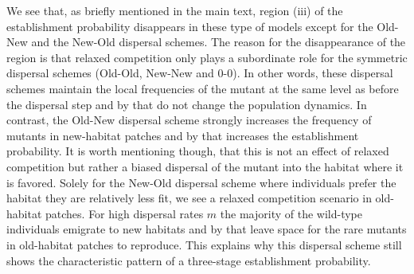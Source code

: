 \documentclass[11pt]{article}
\begin{document}
We see that, as briefly mentioned in the main text, region (iii) of the establishment probability disappears in these type of models except for the Old-New and the New-Old dispersal schemes. The reason for the disappearance of the region is that relaxed competition only plays a subordinate role for the symmetric dispersal schemes (Old-Old, New-New and 0-0). In other words, these dispersal schemes maintain the local frequencies of the mutant at the same level as before the dispersal step and by that do not change the population dynamics. In contrast, the Old-New dispersal scheme strongly increases the frequency of mutants in new-habitat patches and by that increases the establishment probability. It is worth mentioning though, that this is not an effect of relaxed competition but rather a biased dispersal of the mutant into the habitat where it is favored. Solely for the New-Old dispersal scheme where individuals prefer the habitat they are relatively less fit, we see a relaxed competition scenario in old-habitat patches. For high dispersal rates $m$ the majority of the wild-type individuals emigrate to new habitats and by that leave space for the rare mutants in old-habitat patches to reproduce. This explains why this dispersal scheme still shows the characteristic pattern of a three-stage establishment probability.   \newpage 
\end{document}
